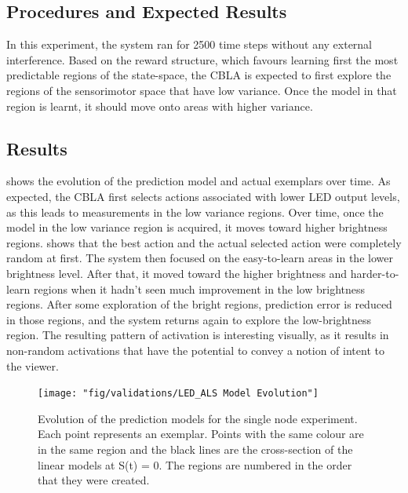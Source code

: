 \subsection{Procedures and Expected Results}
In this experiment, the system ran for 2500 time steps without any external interference. 
Based on the reward structure, which favours learning first the most predictable regions of the state-space, the CBLA is expected to first explore the regions of the sensorimotor space that have low variance. Once the model in that region is learnt, it should move onto areas with higher variance.

\subsection{Results}

 shows the evolution of the prediction model and actual exemplars over time. As expected, the CBLA first selects actions associated with lower LED output levels, as this leads to measurements in the low variance regions. Over time, once the model in the low variance region is acquired, it moves toward higher brightness regions.  shows that the best action and the actual selected action were completely random at first. The system then focused on the easy-to-learn areas in the lower brightness level. After that, it moved toward the higher brightness and harder-to-learn regions when it hadn't seen much improvement in the low brightness regions. After some exploration of the bright regions, prediction error is reduced in those regions, and the system returns again to explore the low-brightness region.  The resulting pattern of activation is interesting visually, as it results in non-random activations that have the potential to convey a notion of intent to the viewer. 
 
\begin{figure} [!htbp]
	\centering
	\texttt{[image: "fig/validations/LED\_ALS Model Evolution"]}
	\caption[Evolution of the prediction models for the single node experiment]{Evolution of the prediction models for the single node experiment. Each point represents an exemplar. Points with the same colour are in the same region and the black lines are the cross-section of the linear models at S(t) = 0. The regions are numbered in the order that they were created. }
	\label{fig:LED_ALS Model Evolution}
\end{figure}

